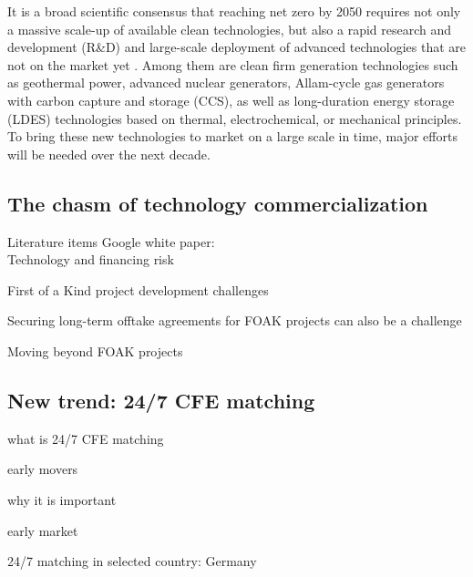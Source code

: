 \documentclass[pdflatex,sn-basic, Numbered]{sn-jnl}%
\theoremstyle{thmstyleone}%
\theoremstyle{thmstyletwo}%
\theoremstyle{thmstylethree}%
\begin{document}
It is a broad scientific consensus that reaching net zero by 2050 requires not only a massive scale-up of available clean technologies, but also a rapid research and development (R\&D) and large-scale deployment of advanced technologies that are not on the market yet \cite{sepulvedaRoleFirmLowCarbon2018, bistlineImpactCarbonDioxide2021, brownUltralongdurationEnergyStorage2023, ieaNetZero20502021}. Among them are clean firm generation technologies such as geothermal power, advanced nuclear generators, Allam-cycle gas generators with carbon capture and storage (CCS), as well as long-duration energy storage (LDES) technologies based on thermal, electrochemical, or mechanical principles. To bring these new technologies to market on a large scale in time, major efforts will be needed over the next decade.


\subsection*{The chasm of technology commercialization}\label{sec2}

Literature items
Google white paper: \citet{google-advancedtech}\\


Technology and financing risk

First of a Kind project development challenges

Securing long-term offtake agreements for FOAK projects can also be a challenge

Moving beyond FOAK projects

\subsection*{New trend: 24/7 CFE matching}\label{sec3}

what is 24/7 CFE matching

early movers

why it is important

early market

24/7 matching in selected country: Germany

\lipsum[1]
\end{document}
